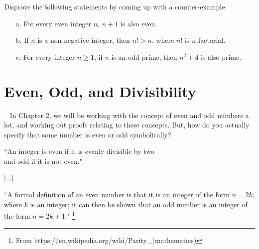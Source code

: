         \begin{questionNOGRADE}{\thequestion}
            Disprove the following statements by coming up with a counter-example:

            \begin{enumerate}
                \item[a.] For every even integer $n$, $n+1$ is also even.

                \item[b.] If $n$ is a non-negative integer, then $n! > n$, where $n!$ is $n$-factorial.

                \item[c.] For every integer $n \geq 1$, if $n$ is an odd prime, then $n^{2} + 4$ is also prime.

            \end{enumerate}
        \end{questionNOGRADE}

    \hrulefill

    \section*{Even, Odd, and Divisibility}

        \begin{intro}{\ }
            In Chapter 2, we will be working with the concept of even and
            odd numbers a lot, and working out proofs relating to these concepts.
            But, how do you actually specify that some number is even or odd symbolically?

            \begin{center}
                ``An integer is even if it is evenly divisible by two\\ and odd if it is not even."

                [...]

                ``A formal definition of an even number is that it is an integer of the form $n = 2k$,
                where $k$ is an integer;
                it can then be shown that an odd number is an integer of the form $n = 2k + 1$."
                \footnote{From https://en.wikipedia.org/wiki/Parity\_(mathematics)}
            \end{center}

        \end{intro}

